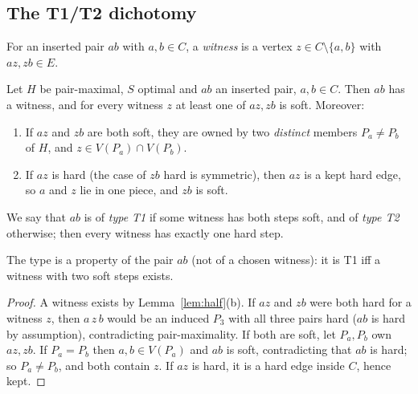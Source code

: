 \subsection{The T1/T2 dichotomy}
For an inserted pair $ab$ with $a,b\in C$, a \emph{witness} is a vertex $z\in C\setminus\{a,b\}$ with $az,zb\in E$.
\begin{theorem}[T1/T2]\label{thm:T1T2}
Let $H$ be pair-maximal, $S$ optimal and $ab$ an inserted pair, $a,b\in C$. Then $ab$ has a witness, and for every witness $z$ at least one of $az,zb$ is soft. Moreover:
\begin{enumerate}
\item[(T1)] If $az$ and $zb$ are both soft, they are owned by two \emph{distinct} members $P_a\ne P_b$ of $H$, and $z\in V(P_a)\cap V(P_b)$.
\item[(T2)] If $az$ is hard (the case of $zb$ hard is symmetric), then $az$ is a kept hard edge, so $a$ and $z$ lie in one piece, and $zb$ is soft.
\end{enumerate}
We say that $ab$ is of \emph{type T1} if some witness has both steps soft, and of \emph{type T2} otherwise; then every witness has exactly one hard step.
\end{theorem}
The type is a property of the pair $ab$ (not of a chosen witness): it is T1 iff a witness with two soft steps exists.
\begin{proof}
A witness exists by Lemma~\ref{lem:half}(b). If $az$ and $zb$ were both hard for a witness $z$, then $a\,z\,b$ would be an induced $P_3$ with all three pairs hard ($ab$ is hard by assumption), contradicting pair-maximality. If both are soft, let $P_a,P_b$ own $az,zb$. If $P_a=P_b$ then $a,b\in V(P_a)$ and $ab$ is soft, contradicting that $ab$ is hard; so $P_a\ne P_b$, and both contain $z$. If $az$ is hard, it is a hard edge inside $C$, hence kept.
\end{proof}

